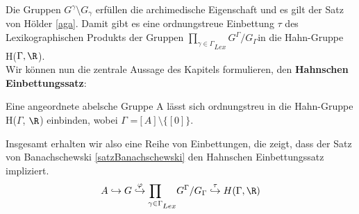 Die Gruppen $G^\gamma \setminus G_\gamma$ erfüllen die archimedische Eigenschaft und es gilt der Satz von Hölder \ref{aga}. Damit gibt es eine ordnungstreue Einbettung $\tau$ des Lexikographischen Produkts der Gruppen ${\prod_{\gamma \in \Gamma}}_{Lex} G^\Gamma/ G_\Gamma$in die Hahn-Gruppe H($\Gamma, \R$).\\
Wir können nun die zentrale Aussage des Kapitels formulieren, den \textbf{Hahnschen Einbettungssatz}:
\begin{satz} \label{hebs} %
Eine angeordnete abelsche Gruppe A lässt sich ordnungstreu in die Hahn-Gruppe H($ \Gamma $, $ \R $) einbinden, wobei $ \Gamma$ =$ [A]\setminus \{[0]\} $.
\end{satz}
Insgesamt erhalten wir also eine Reihe von Einbettungen, die zeigt, dass der Satz von Banachschewski \ref{satzBanachschewski} den Hahnschen Einbettungssatz impliziert.\\
\[A \hookrightarrow G \stackrel{\mathrm{\varphi}}\hookrightarrow {\prod_{\gamma \in \Gamma}}_{Lex} G^\Gamma/ G_\Gamma \stackrel{\mathrm{\tau}}\hookrightarrow H(\Gamma, \R)\]


